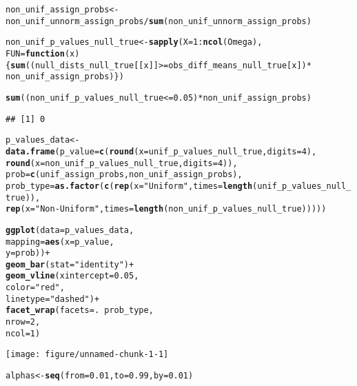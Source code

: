 \documentclass[11pt,leqno]{article}\usepackage[]{graphicx}\usepackage[]{color}
\makeatletter
\def\maxwidth{ %
  \ifdim\Gin@nat@width>\linewidth
    \linewidth
  \else
    \Gin@nat@width
  \fi
}
\newcommand{\hlnum}[1]{\textcolor[rgb]{0.686,0.059,0.569}{#1}}%
\newcommand{\hlstr}[1]{\textcolor[rgb]{0.192,0.494,0.8}{#1}}%
\newcommand{\hlopt}[1]{\textcolor[rgb]{0,0,0}{#1}}%
\newcommand{\hlstd}[1]{\textcolor[rgb]{0.345,0.345,0.345}{#1}}%
\newcommand{\hlkwa}[1]{\textcolor[rgb]{0.161,0.373,0.58}{\textbf{#1}}}%
\newcommand{\hlkwb}[1]{\textcolor[rgb]{0.69,0.353,0.396}{#1}}%
\newcommand{\hlkwc}[1]{\textcolor[rgb]{0.333,0.667,0.333}{#1}}%
\newcommand{\hlkwd}[1]{\textcolor[rgb]{0.737,0.353,0.396}{\textbf{#1}}}%
\newenvironment{kframe}{%
 \def\at@end@of@kframe{}%
 \ifinner\ifhmode%
  \def\at@end@of@kframe{\end{minipage}}%
  \begin{minipage}{\columnwidth}%
 \fi\fi%
 \def\FrameCommand##1{\hskip\@totalleftmargin \hskip-\fboxsep
 \colorbox{shadecolor}{##1}\hskip-\fboxsep
     \hskip-\linewidth \hskip-\@totalleftmargin \hskip\columnwidth}%
 \MakeFramed {\advance\hsize-\width
   \@totalleftmargin\z@ \linewidth\hsize
   \@setminipage}}%
 {\par\unskip\endMakeFramed%
 \at@end@of@kframe}
\newenvironment{knitrout}{}{} %
\theoremstyle{newstyle}
\makeatother
\begin{document}
\begin{knitrout}
\begin{kframe}
\begin{alltt}
\hlstd{non_unif_assign_probs} \hlkwb{<-} \hlstd{non_unif_unnorm_assign_probs}\hlopt{/}\hlkwd{sum}\hlstd{(non_unif_unnorm_assign_probs)}

\hlstd{non_unif_p_values_null_true} \hlkwb{<-} \hlkwd{sapply}\hlstd{(}\hlkwc{X} \hlstd{=} \hlnum{1}\hlopt{:}\hlkwd{ncol}\hlstd{(Omega),}
                                      \hlkwc{FUN} \hlstd{=} \hlkwa{function}\hlstd{(}\hlkwc{x}\hlstd{) \{} \hlkwd{sum}\hlstd{((null_dists_null_true[[x]]} \hlopt{>=} \hlstd{obs_diff_means_null_true[x])} \hlopt{*}
                                                                \hlstd{non_unif_assign_probs) \})}

\hlkwd{sum}\hlstd{((non_unif_p_values_null_true} \hlopt{<=} \hlnum{0.05}\hlstd{)} \hlopt{*} \hlstd{non_unif_assign_probs)}
\end{alltt}
\begin{verbatim}
## [1] 0
\end{verbatim}
\begin{alltt}
\hlstd{p_values_data} \hlkwb{<-} \hlkwd{data.frame}\hlstd{(}\hlkwc{p_value} \hlstd{=} \hlkwd{c}\hlstd{(}\hlkwd{round}\hlstd{(}\hlkwc{x} \hlstd{= unif_p_values_null_true,} \hlkwc{digits} \hlstd{=} \hlnum{4}\hlstd{),}
                                        \hlkwd{round}\hlstd{(}\hlkwc{x} \hlstd{= non_unif_p_values_null_true,} \hlkwc{digits} \hlstd{=} \hlnum{4}\hlstd{)),}
                            \hlkwc{prob} \hlstd{=} \hlkwd{c}\hlstd{(unif_assign_probs, non_unif_assign_probs),}
                            \hlkwc{prob_type} \hlstd{=} \hlkwd{as.factor}\hlstd{(}\hlkwd{c}\hlstd{(}\hlkwd{rep}\hlstd{(}\hlkwc{x} \hlstd{=} \hlstr{"Uniform"}\hlstd{,} \hlkwc{times} \hlstd{=} \hlkwd{length}\hlstd{(unif_p_values_null_true)),}
                                                    \hlkwd{rep}\hlstd{(}\hlkwc{x} \hlstd{=} \hlstr{"Non-Uniform"}\hlstd{,} \hlkwc{times} \hlstd{=} \hlkwd{length}\hlstd{(non_unif_p_values_null_true)))))}

\hlkwd{ggplot}\hlstd{(}\hlkwc{data} \hlstd{= p_values_data,}
       \hlkwc{mapping} \hlstd{=} \hlkwd{aes}\hlstd{(}\hlkwc{x} \hlstd{= p_value,}
                     \hlkwc{y} \hlstd{= prob))} \hlopt{+}
  \hlkwd{geom_bar}\hlstd{(}\hlkwc{stat} \hlstd{=} \hlstr{"identity"}\hlstd{)} \hlopt{+}
  \hlkwd{geom_vline}\hlstd{(}\hlkwc{xintercept} \hlstd{=} \hlnum{0.05}\hlstd{,}
             \hlkwc{color} \hlstd{=} \hlstr{"red"}\hlstd{,}
             \hlkwc{linetype} \hlstd{=} \hlstr{"dashed"}\hlstd{)} \hlopt{+}
  \hlkwd{facet_wrap}\hlstd{(}\hlkwc{facets} \hlstd{= .}\hlopt{~} \hlstd{prob_type,}
             \hlkwc{nrow} \hlstd{=} \hlnum{2}\hlstd{,}
             \hlkwc{ncol} \hlstd{=} \hlnum{1}\hlstd{)}
\end{alltt}
\end{kframe}
\texttt{[image: figure/unnamed-chunk-1-1]} 
\begin{kframe}\begin{alltt}
\hlstd{alphas} \hlkwb{<-} \hlkwd{seq}\hlstd{(}\hlkwc{from} \hlstd{=} \hlnum{0.01}\hlstd{,} \hlkwc{to} \hlstd{=} \hlnum{0.99}\hlstd{,} \hlkwc{by} \hlstd{=} \hlnum{0.01}\hlstd{)}


\end{alltt}
\end{kframe}
\end{knitrout}
\end{document}
